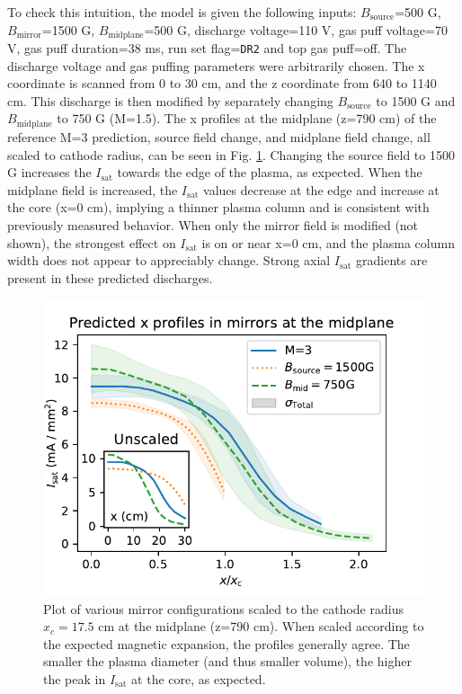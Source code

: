 To check this intuition, the model is given the following inputs: $B_\text{source}$=500 G, $B_\text{mirror}$=1500 G, $B_\text{midplane}$=500 G, discharge voltage=110 V, gas puff voltage=70 V, gas puff duration=38 ms, run set flag=\texttt{DR2} and top gas puff=off. The discharge voltage and gas puffing parameters were arbitrarily chosen. The x coordinate is scanned from 0 to 30 cm, and the z coordinate from 640 to 1140 cm. This discharge is then modified by separately changing $B_\text{source}$ to 1500 G and $B_\text{midplane}$ to 750 G (M=1.5). %
The x profiles at the midplane (z=790 cm) of the reference M=3 prediction, source field change, and midplane field change, all scaled to cathode radius, can be seen in Fig. \ref{fig:changing-B-field_M=3_x-prof}. Changing the source field to 1500 G increases the $I_\text{sat}$ towards the edge of the plasma, as expected. When the midplane field is increased, the $I_\text{sat}$ values decrease at the edge and increase at the core (x=0 cm), implying a thinner plasma column and is consistent with previously measured behavior. When only the mirror field is modified (not shown), the strongest effect on $I_\text{sat}$ is on or near x=0 cm, and the plasma column width does not appear to appreciably change. Strong axial $I_\text{sat}$ gradients are present in these predicted discharges.

\begin{figure}
	\centering
	\includegraphics[width=\columnwidth]{figures/changing-B-field_M=3_x-prof.pdf}
	\caption[size=12]{\label{fig:changing-B-field_M=3_x-prof}Plot of various mirror configurations scaled to the cathode radius $x_c=17.5$ cm at the midplane (z=790 cm). When scaled according to the expected magnetic expansion, the profiles generally agree. The smaller the plasma diameter (and thus smaller volume), the higher the peak in $I_\text{sat}$ at the core, as expected. }
\end{figure}

